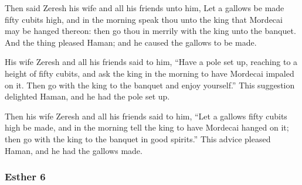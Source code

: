 			\begin{versebox}
					\item[BHS] 
					\item[LXX] 
					\item[ASV] Then said Zeresh his wife and all his friends unto him, Let a gallows be made fifty cubits high, and in the morning speak thou unto the king that Mordecai may be hanged thereon: then go thou in merrily with the king unto the banquet. And the thing pleased Haman; and he caused the gallows to be made.
					\item[NIV] His wife Zeresh and all his friends said to him, “Have a pole set up, reaching to a height of fifty cubits, and ask the king in the morning to have Mordecai impaled on it. Then go with the king to the banquet and enjoy yourself.” This suggestion delighted Haman, and he had the pole set up.
					\item[NRSV] Then his wife Zeresh and all his friends said to him, “Let a gallows fifty cubits high be made, and in the morning tell the king to have Mordecai hanged on it; then go with the king to the banquet in good spirits.” This advice pleased Haman, and he had the gallows made.
			\end{versebox}
	\subsubsection{Esther 6} %
		\label{ESTHER-6}

